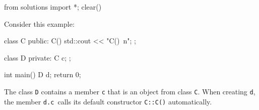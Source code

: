 \begin{python0}
from solutions import *; clear()
\end{python0}

Consider this example:
\begin{console}
class C
{
public:
        C() { std::cout << "C()\ n"; }
};

class D
{
private:
        C c;
};

int main()
{   
    D d;
    return 0;
}
\end{console}

The class \texttt{D} contains a member \texttt{c} that is an object from
class \texttt{C}. When creating \texttt{d}, the member \texttt{d.c }calls its
default constructor \texttt{C::C()} automatically.

